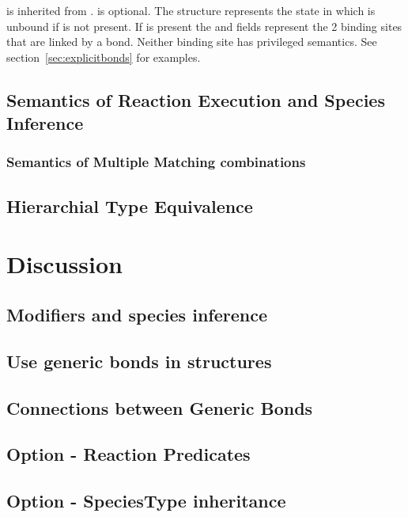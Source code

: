\documentclass{cekarticle}
\begin{document}
 is inherited from .
 is optional.
The  structure represents the state in which  is unbound if  is not present.
If  is present the  and
 fields represent the 2 binding sites that are linked by a bond.
Neither binding site has privileged semantics.
See section~\ref{sec:explicitbonds} for examples.

\subsection{Semantics of Reaction Execution and Species Inference}

\subsubsection{Semantics of Multiple Matching combinations}

\subsection{Hierarchial Type Equivalence}

\clearpage
\section{Discussion}

\subsection{Modifiers and species inference}

\subsection{Use generic bonds in  structures}

\subsection{Connections between Generic Bonds}

\subsection{Option - Reaction Predicates}

\subsection{Option - SpeciesType inheritance}
\end{document}
